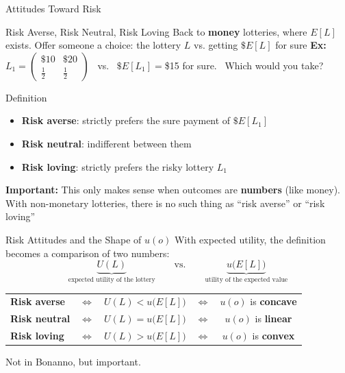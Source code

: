 
\begin{frame}[standout]
Attitudes Toward Risk
\end{frame}

\begin{frame}{Risk Averse, Risk Neutral, Risk Loving}
Back to \textbf{money} lotteries, where $E[L]$ exists. Offer someone a choice:
\bsk
\centering
the lottery $L$ \qquad vs. \qquad getting $\$E[L]$ for sure
\bsk
\textbf{Ex:} \ $L_1=\begin{pmatrix} \$10 & \$20 \\[2pt] \tfrac12 & \tfrac12\end{pmatrix}$ \ vs. \ $\$E[L_1]=$\$15 for sure. \ Which would you take?
\raggedright
\begin{block}{Definition}
\begin{itemize}
    \item \textbf{Risk averse}: strictly prefers the sure payment of $\$E[L_1]$
    \item \textbf{Risk neutral}: indifferent between them
    \item \textbf{Risk loving}: strictly prefers the risky lottery $L_1$
\end{itemize}
\end{block}
\bsk
\vfill
\textbf{Important:} This only makes sense when outcomes are \textbf{numbers} (like money).\\
With non-monetary lotteries, there is no such thing as ``risk averse'' or ``risk loving''
\vspace{-0.3in}
\end{frame}

\begin{frame}{Risk Attitudes and the Shape of $u(o)$}
With expected utility, the definition becomes a comparison of two numbers:
\bsk
$$\underbrace{U(L)}_{\text{expected utility of the lottery}}
\qquad\text{vs.}\qquad
\underbrace{u\big(E[L]\big)}_{\text{utility of the expected value}}$$
\bsk
\centering
\renewcommand{\arraystretch}{1.7}
\begin{tabular}{lcccc}
\textbf{Risk averse} & $\iff$ & $U(L)<u\big(E[L]\big)$ & $\iff$ & $u(o)$ is \textbf{concave} \\
\textbf{Risk neutral} & $\iff$ & $U(L)=u\big(E[L]\big)$ & $\iff$ & $u(o)$ is \textbf{linear} \\
\textbf{Risk loving} & $\iff$ & $U(L)>u\big(E[L]\big)$ & $\iff$ & $u(o)$ is \textbf{convex} \\
\end{tabular}
\vfill
\raggedright
{\footnotesize Not in Bonanno, but important.}
\vspace{-0.2in}
\end{frame}

